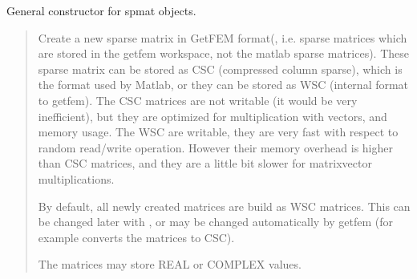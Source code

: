 \documentclass[a4paper,11pt,english]{sphinxmanual}
\begin{document}
\sphinxAtStartPar
General constructor for spmat objects.
\begin{quote}

\sphinxAtStartPar
Create a new sparse matrix in GetFEM format(, i.e. sparse
matrices which are stored in the getfem workspace, not the matlab sparse
matrices). These sparse matrix can be stored as CSC (compressed column
sparse), which is the format used by Matlab, or they can be stored as WSC
(internal format to getfem). The CSC matrices are not writable (it would
be very inefficient), but they are optimized for multiplication with
vectors, and memory usage. The WSC are writable, they are very fast with
respect to random read/write operation. However their memory overhead is
higher than CSC matrices, and they are a little bit slower for
matrix\sphinxhyphen{}vector multiplications.

\sphinxAtStartPar
By default, all newly created matrices are build as WSC matrices. This can
be changed later with , or may be changed
automatically by getfem (for example  converts the
matrices to CSC).

\sphinxAtStartPar
The matrices may store REAL or COMPLEX values.
\end{quote}
\end{document}
